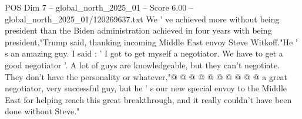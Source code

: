 \begin{textsample}{POS Dim 7 – global\_north\_2025\_01 – Score 6.00 – global\_north\_2025\_01/120269637.txt}
We ' ve achieved more without being president than the Biden administration achieved in four years with being president,"Trump said, thanking incoming Middle East envoy Steve Witkoff."He ' s an amazing guy.
I said : ' I got to get myself a negotiator.
We have to get a good negotiator '.
A lot of guys are knowledgeable, but they can't negotiate.
They don't have the personality or whatever,"@ @ @ @ @ @ @ @ @ @ a great negotiator, very successful guy, but he ' s our new special envoy to the Middle East for helping reach this great breakthrough, and it really couldn't have been done without Steve."

\end{textsample}
